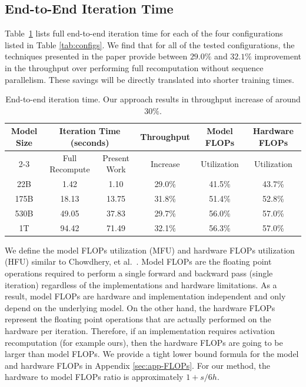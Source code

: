 \documentclass{article}
\begin{document}
\subsection{End-to-End Iteration Time}
\label{sec:e2e-iteration-time}

Table~\ref{tab:iteration_time} lists full end-to-end iteration time for each of the four configurations listed in Table \ref{tab:configs}. We find that for all of the tested configurations, the techniques presented in the paper provide between $29.0\%$ and $32.1\%$ improvement in the throughput over performing full recomputation without sequence parallelism. These savings will be directly translated into shorter training times.  

\begin{table}
    \centering
    \begin{tabular}{c|c|c|c|c|c}
         \multirow{2}{*}{Model Size} & \multicolumn{2}{c|}{Iteration Time (seconds)} &
         Throughput & Model FLOPs & Hardware FLOPs\\
         \cline{2-3}
          & Full Recompute & Present Work & Increase & Utilization & Utilization\\
          \hline
          22B   & 1.42  & 1.10  & 29.0\% & 41.5\% & 43.7\% \\
          175B  & 18.13 & 13.75 & 31.8\% & 51.4\% & 52.8\% \\
          530B  & 49.05 & 37.83 & 29.7\% & 56.0\% & 57.0\% \\
          1T    & 94.42 & 71.49 & 32.1\% & 56.3\% & 57.0\% \\
    \end{tabular}
    \caption{End-to-end iteration time. Our approach results in throughput increase of around $30\%$.}
    \label{tab:iteration_time}
\end{table}

We define the model FLOPs utilization (MFU) and hardware FLOPs utilization (HFU) similar to Chowdhery, et al.~\cite{palm}. Model FLOPs are the floating point operations required to perform a single forward and backward pass (single iteration) regardless of the implementations and hardware limitations. As a result, model FLOPs are hardware and implementation independent and only depend on the underlying model. On the other hand, the hardware FLOPs represent the floating point operations that are actually performed on the hardware per iteration. Therefore, if an implementation requires activation recomputation (for example ours), then the hardware FLOPs are going to be larger than model FLOPs. We provide a tight lower bound formula for the model and hardware FLOPs in Appendix \ref{sec:app-FLOPs}. For our method, the hardware to model FLOPs ratio is approximately $1+s/6h$.
\end{document}
